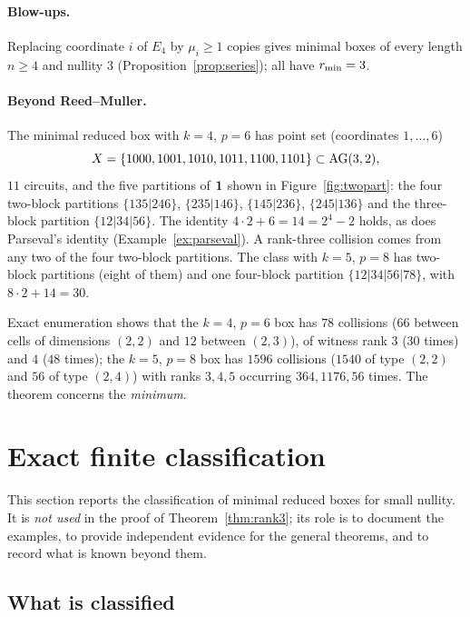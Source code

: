 \paragraph{Blow-ups.} Replacing coordinate $i$ of $E_4$ by $\mu_i\ge1$ copies gives minimal boxes of every length $n\ge4$ and nullity $3$ (Proposition~\ref{prop:series}); all have $r_{\min}=3$.

\paragraph{Beyond Reed--Muller.} The minimal reduced box with $k=4$, $p=6$ has point set (coordinates $1,\dots,6$)
\[
X=\{1000,1001,1010,1011,1100,1101\}\subset\mathrm{AG}(3,2),
\]
$11$ circuits, and the five partitions of $\mathbf 1$ shown in Figure~\ref{fig:twopart}: the four two-block partitions $\{135|246\}$, $\{235|146\}$, $\{145|236\}$, $\{245|136\}$ and the three-block partition $\{12|34|56\}$. The identity $4\cdot2+6=14=2^4-2$ holds, as does Parseval's identity (Example~\ref{ex:parseval}). A rank-three collision comes from any two of the four two-block partitions. The class with $k=5$, $p=8$ has two-block partitions (eight of them) and one four-block partition $\{12|34|56|78\}$, with $8\cdot2+14=30$.

\begin{remark}
Exact enumeration shows that the $k=4$, $p=6$ box has $78$ collisions ($66$ between cells of dimensions $(2,2)$ and $12$ between $(2,3)$), of witness rank $3$ ($30$ times) and $4$ ($48$ times); the $k=5$, $p=8$ box has $1596$ collisions ($1540$ of type $(2,2)$ and $56$ of type $(2,4)$) with ranks $3,4,5$ occurring $364,1176,56$ times. The theorem concerns the \emph{minimum}.
\end{remark}

\section{Exact finite classification}\label{sec:classify}

This section reports the classification of minimal reduced boxes for small nullity. It is \emph{not used} in the proof of Theorem~\ref{thm:rank3}; its role is to document the examples, to provide independent evidence for the general theorems, and to record what is known beyond them.

\subsection{What is classified}

